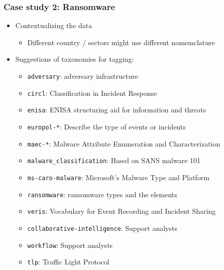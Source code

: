 \begin{frame}
    \frametitle{Case study 2: Ransomware}
    \begin{itemize}
        \item Contextualizing the data
        \begin{itemize}
            \item Different country / sectors might use different nomemclature
        \end{itemize}
        \item Suggestions of taxonomies for tagging:
        \begin{itemize}
            \item \texttt{adversary}: adversary infrastructure
            \item \texttt{circl}: Classification in Incident Response
            \item \texttt{enisa}: ENISA structuring aid for information and threats
            \item \texttt{europol-*}: Describe the type of events or incidents
            \item \texttt{maec-*}: Malware Attribute Enumeration and Characterization
            \item \texttt{malware\_classification}: Based on SANS malware 101
            \item \texttt{ms-caro-malware}: Microsoft’s Malware Type and Platform
            \item \texttt{ransomware}: ransomware types and the elements
            \item \texttt{veris}: Vocabulary for Event Recording and Incident Sharing 
            \item \texttt{collaborative-intelligence}: Support analysts
            \item \texttt{workflow}: Support analysts
            \item \texttt{tlp}: Traffic Light Protocol 
        \end{itemize}
    \end{itemize}
\end{frame}


